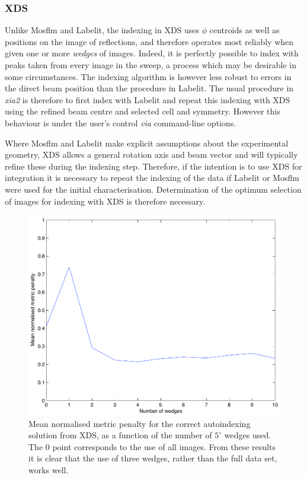 \documentclass[preprint,pdf]{iucr}
\begin{document}
\subsubsection{XDS}

Unlike Mosflm and Labelit, the indexing in XDS uses $\phi$
centroids as well as positions on the image of reflections, and
therefore operates most reliably when given one or more \emph{wedges} of
images. Indeed, it is perfectly possible to index with peaks taken
from every image in the sweep, a process which may be desirable in some
circumstances. The indexing algorithm is however less robust to
errors in the direct beam position than the procedure in
Labelit. The usual procedure in \emph{xia2} is therefore to first
index with Labelit and repeat this indexing with XDS
using the refined beam centre and selected cell and symmetry. However
this behaviour is under the user's control \emph{via} command-line options.

Where Mosflm and Labelit make explicit assumptions about the experimental
geometry, XDS allows a general rotation axis and beam vector and will
typically refine these during the indexing step. Therefore, if the
intention is to use XDS for integration it is necessary to
repeat the indexing of the data if Labelit or Mosflm were used for the
initial characterisation. Determination of the optimum
selection of images for indexing with XDS is therefore necessary.

\begin{figure}
\caption{Mean normalised metric penalty for the correct autoindexing 
solution from XDS, as a function of the number of $5^{\circ}$ wedges used.
The 0 point corresponds to the use of all images. From these results it is
clear that the use of three wedges, rather than the full data set, works
well.
\label{figure:xds_n_images}}
\centering
\includegraphics[scale=0.5]{figures/xds_n_wedges.pdf}
\end{figure}
\end{document}
